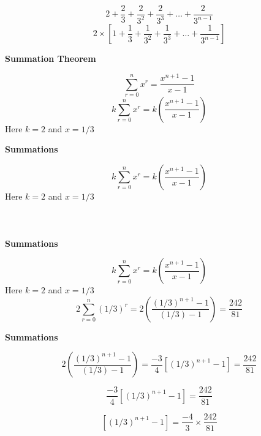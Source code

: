 \documentclass[12pt]{article}
\begin{document}
\[  2 + \frac{2}{3} + \frac{2}{3^2} + \frac{2}{3^3} +  \ldots + \frac{2}{3^{n-1}} \]
\[  2 \times \left[ 1 + \frac{1}{3} + \frac{1}{3^2} + \frac{1}{3^3} +  \ldots + \frac{1}{3^{n-1}}   \right] \]

\textbf{Summation Theorem}

\[ \sum^{n}_{r=0} x^r = \frac{x^{n+1}-1}{x-1} \]
\[ k  \sum^{n}_{r=0} x^r  =  k \left( \frac{x^{n+1}-1}{x-1} \right) \]
Here $k=2$ and $x = 1/3$ 





\noindent\textbf{Summations}


\[ k  \sum^{n}_{r=0} x^r  =  k \left( \frac{x^{n+1}-1}{x-1} \right) \]
Here $k=2$ and $x = 1/3$ 
\[  \phantom{ 2  \sum^{n}_{r=0} (1/3)^r  =  2 \left( \frac{(1/3)^{n+1}-1}{(1/3)-1} \right) } \]





\noindent\textbf{Summations}


\[ k  \sum^{n}_{r=0} x^r  =  k \left( \frac{x^{n+1}-1}{x-1} \right) \]
Here $k=2$ and $x = 1/3$ 
\[  2  \sum^{n}_{r=0} (1/3)^r  =  2 \left( \frac{(1/3)^{n+1}-1}{(1/3)-1} \right)  = \frac{242}{81} \]





\noindent\textbf{Summations}

\[    2 \left( \frac{(1/3)^{n+1}-1}{(1/3)-1} \right)  = \frac{-3}{4} \left[ (1/3)^{n+1}-1 \right]  = \frac{242}{81} \]

\[     \frac{-3}{4} \left[ (1/3)^{n+1}-1 \right]  = \frac{242}{81} \]

\[      \left[ (1/3)^{n+1}-1 \right]  =  \frac{-4}{3} \times \frac{242}{81} \]


\end{document}
